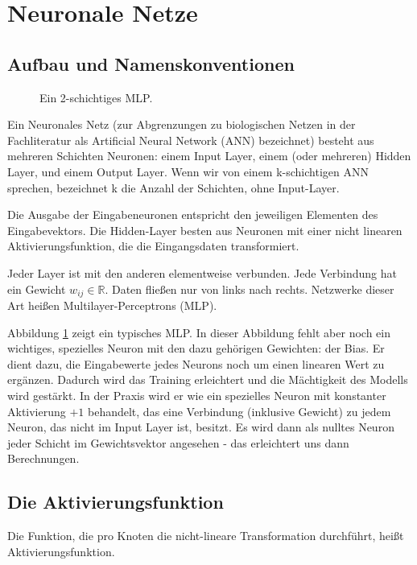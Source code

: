 \section{Neuronale Netze} %

\subsection{Aufbau und Namenskonventionen}
\begin{figure}[ht!]
  \centering
    
  \caption{Ein 2-schichtiges MLP.}
  \label{fig:MLP}
\end{figure}


Ein Neuronales Netz (zur Abgrenzungen zu biologischen Netzen in der Fachliteratur als Artificial Neural Network (ANN) bezeichnet) besteht aus mehreren Schichten Neuronen: einem Input Layer, einem (oder mehreren) Hidden Layer, und einem Output Layer. 
Wenn wir von einem k-schichtigen ANN sprechen, bezeichnet k die Anzahl der Schichten, ohne Input-Layer.

Die Ausgabe der Eingabeneuronen entspricht den jeweiligen Elementen des Eingabevektors.
Die Hidden-Layer besten aus Neuronen mit einer nicht linearen Aktivierungsfunktion, die die Eingangsdaten transformiert.

Jeder Layer ist mit den anderen elementweise verbunden. Jede Verbindung hat ein Gewicht $w_{ij} \in \mathbb{R}$. Daten fließen nur von links nach rechts. Netzwerke dieser Art heißen Multilayer-Perceptrons (MLP). 

Abbildung \ref{fig:MLP} zeigt ein typisches MLP. In dieser Abbildung fehlt aber noch ein wichtiges, spezielles Neuron mit den dazu gehörigen Gewichten: der Bias. Er dient dazu, die Eingabewerte jedes Neurons noch um einen linearen Wert zu ergänzen. Dadurch wird das Training erleichtert und die Mächtigkeit des Modells wird gestärkt. In der Praxis wird er wie ein spezielles Neuron mit konstanter Aktivierung $+1$ behandelt, das eine Verbindung (inklusive Gewicht) zu jedem Neuron, das nicht im Input Layer ist, besitzt. Es wird dann als nulltes Neuron jeder Schicht im Gewichtsvektor angesehen - das erleichtert uns dann Berechnungen.
 

\subsection{Die Aktivierungsfunktion}

Die Funktion, die pro Knoten die nicht-lineare Transformation durchführt, heißt Aktivierungsfunktion. 

